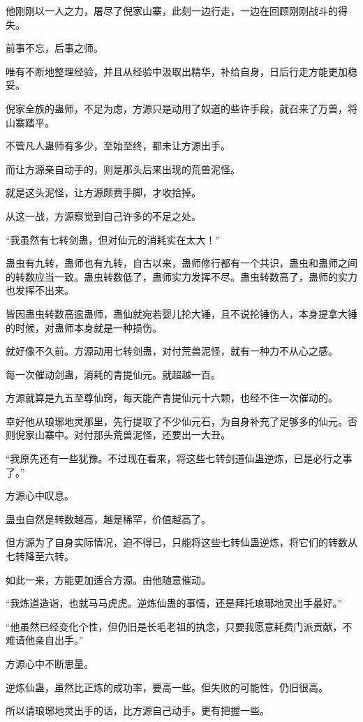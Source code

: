 \begin{this_body}
他刚刚以一人之力，屠尽了倪家山寨，此刻一边行走，一边在回顾刚刚战斗的得失。

前事不忘，后事之师。

唯有不断地整理经验，并且从经验中汲取出精华，补给自身，日后行走方能更加稳妥。

倪家全族的蛊师，不足为虑，方源只是动用了奴道的些许手段，就召来了万兽，将山寨踏平。

不管凡人蛊师有多少，至始至终，都未让方源出手。

而让方源亲自动手的，则是那头后来出现的荒兽泥怪。

就是这头泥怪，让方源颇费手脚，才收拾掉。

从这一战，方源察觉到自己许多的不足之处。

“我虽然有七转剑蛊，但对仙元的消耗实在太大！”

蛊虫有九转，蛊师也有九转，自古以来，蛊师修行都有一个共识，蛊虫和蛊师之间的转数应当一致。蛊虫转数低了，蛊师实力发挥不尽。蛊虫转数高了，蛊师的实力也发挥不出来。

皆因蛊虫转数高逾蛊师，蛊仙就宛若婴儿抡大锤，且不说抡锤伤人，本身提拿大锤的时候，对蛊师本身就是一种损伤。

就好像不久前。方源动用七转剑蛊，对付荒兽泥怪，就有一种力不从心之感。

每一次催动剑蛊，消耗的青提仙元。就超越一百。

方源就算是九五至尊仙窍，每天能产青提仙元十六颗，也经不住一次催动的。

幸好他从琅琊地灵那里，先行提取了不少仙元石，为自身补充了足够多的仙元。否则倪家山寨中。对付那头荒兽泥怪，还要出一大丑。

“我原先还有一些犹豫。不过现在看来，将这些七转剑道仙蛊逆炼，已是必行之事了。”

方源心中叹息。

蛊虫自然是转数越高，越是稀罕，价值越高了。

但方源为了自身实际情况，迫不得已，只能将这些七转仙蛊逆炼，将它们的转数从七转降至六转。

如此一来，方能更加适合方源。由他随意催动。

“我炼道造诣，也就马马虎虎。逆炼仙蛊的事情，还是拜托琅琊地灵出手最好。”

“他虽然已经变化个性，但仍旧是长毛老祖的执念，只要我愿意耗费门派贡献，不难请他亲自出手。”

方源心中不断思量。

逆炼仙蛊，虽然比正炼的成功率，要高一些。但失败的可能性，仍旧很高。

所以请琅琊地灵出手的话，比方源自己动手。更有把握一些。


\end{this_body}
